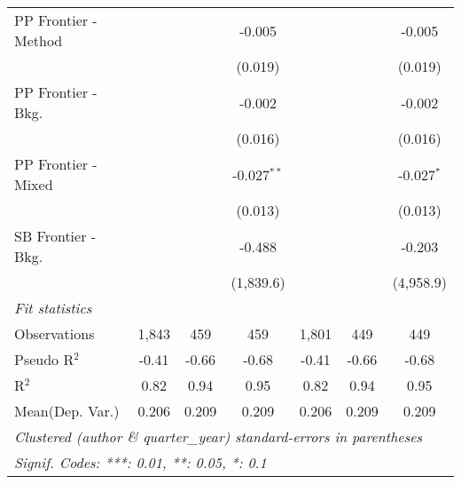 \begin{tabular}{lcccccc}
   PP Frontier - Method &         &           & -0.005        &         &           & -0.005\\   
                        &         &           & (0.019)       &         &           & (0.019)\\   
   PP Frontier - Bkg.   &         &           & -0.002        &         &           & -0.002\\   
                        &         &           & (0.016)       &         &           & (0.016)\\   
   PP Frontier - Mixed  &         &           & -0.027$^{**}$ &         &           & -0.027$^{*}$\\   
                        &         &           & (0.013)       &         &           & (0.013)\\   
   SB Frontier - Bkg.   &         &           & -0.488        &         &           & -0.203\\   
                        &         &           & (1,839.6)     &         &           & (4,958.9)\\   
   \midrule
   \emph{Fit statistics}\\
   Observations         & 1,843   & 459       & 459           & 1,801   & 449       & 449\\  
   Pseudo R$^2$         & -0.41   & -0.66     & -0.68         & -0.41   & -0.66     & -0.68\\  
   R$^2$                & 0.82    & 0.94      & 0.95          & 0.82    & 0.94      & 0.95\\  
Mean(Dep. Var.) & 0.206 & 0.209 & 0.209 & 0.206 & 0.209 & 0.209 \\
   \midrule \midrule
   \multicolumn{7}{l}{\emph{Clustered (author \& quarter\_year) standard-errors in parentheses}}\\
   \multicolumn{7}{l}{\emph{Signif. Codes: ***: 0.01, **: 0.05, *: 0.1}}\\
\end{tabular}
\par\endgroup

